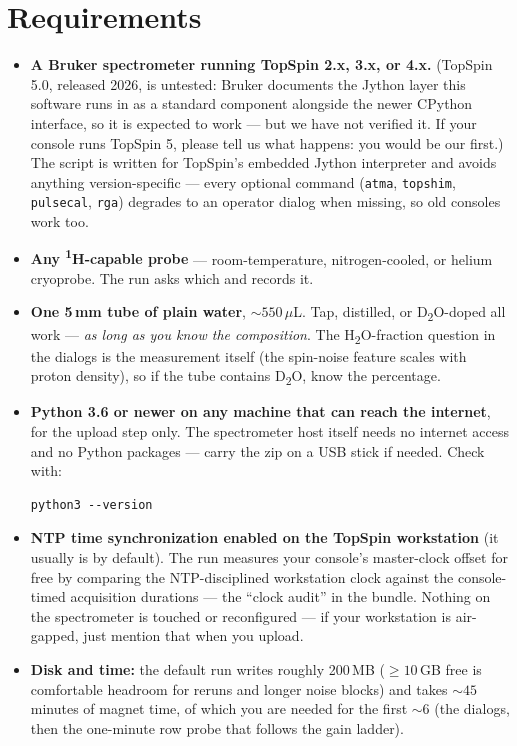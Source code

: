 \documentclass[11pt]{article}
\newcommand{\hnmr}{\textsuperscript{1}H}
\newcommand{\dtwo}{D\textsubscript{2}O}
\newcommand{\htwo}{H\textsubscript{2}O}
\newcommand{\ts}{TopSpin}
\begin{document}
\section{Requirements}

\begin{itemize}
\item \textbf{A Bruker spectrometer running \ts{} 2.x, 3.x, or 4.x.} (\ts{} 5.0, released 2026, is untested: Bruker documents the Jython layer this software runs in as a standard component alongside the newer CPython interface, so it is expected to work --- but we have not verified it. If your console runs \ts{} 5, please tell us what happens: you would be our first.) The
      script is written for \ts's embedded Jython interpreter and avoids
      anything version-specific --- every optional command (\texttt{atma},
      \texttt{topshim}, \texttt{pulsecal}, \texttt{rga}) degrades to an
      operator dialog when missing, so old consoles work too.
\item \textbf{Any \hnmr-capable probe} --- room-temperature, nitrogen-cooled,
      or helium cryoprobe. The run asks which and records it.
\item \textbf{One 5\,mm tube of plain water}, ${\sim}550\,\mu$L. Tap,
      distilled, or \dtwo-doped all work --- \emph{as long as you know the
      composition}. The \htwo-fraction question in the dialogs is the
      measurement itself (the spin-noise feature scales with proton density),
      so if the tube contains \dtwo, know the percentage.
\item \textbf{Python 3.6 or newer on any machine that can reach the
      internet}, for the upload step only. The spectrometer host itself needs
      no internet access and no Python packages --- carry the zip on a USB
      stick if needed. Check with:
\begin{lstlisting}
python3 --version
\end{lstlisting}
\item \textbf{NTP time synchronization enabled on the \ts{} workstation}
      (it usually is by default). The run measures your console's master-clock
      offset for free by comparing the NTP-disciplined workstation clock
      against the console-timed acquisition durations --- the ``clock audit''
      in the bundle. Nothing on the spectrometer is touched or reconfigured
      --- if your workstation is air-gapped, just mention that when you
      upload.
\item \textbf{Disk and time:} the default run writes roughly 200\,MB
      (${\geq}10$\,GB free is comfortable headroom for reruns and longer noise
      blocks) and takes ${\sim}45$ minutes of magnet time, of which you are
      needed for the first ${\sim}6$ (the dialogs, then the one-minute row
      probe that follows the gain ladder).
\end{itemize}
\end{document}
